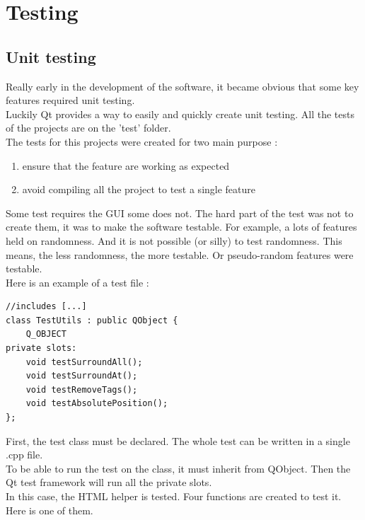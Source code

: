 \part{Testing}

\chapter{Unit testing}
Really early in the development of the software, it became obvious that some key features required unit testing.\\
Luckily Qt provides a way to easily and quickly create unit testing. All the tests of the projects are on the 'test' folder.\\
The tests for this projects were created for two main purpose :
\begin{enumerate}
	\item ensure that the feature are working as expected
	\item avoid compiling all the project to test a single feature
\end{enumerate}
Some test requires the GUI some does not. The hard part of the test was not to create them, it was to make the software testable. For example, a lots of features held on randomness. And it is not possible (or silly) to test randomness. This means, the less randomness, the more testable. Or pseudo-random features were testable.\\
Here is an example of a test file :

\begin{lstlisting}
//includes [...]
class TestUtils : public QObject {
    Q_OBJECT
private slots:
    void testSurroundAll();
    void testSurroundAt();
    void testRemoveTags();
    void testAbsolutePosition();
};
\end{lstlisting}
First, the test class must be declared. The whole test can be written in a single .cpp file.\\
To be able to run the test on the class, it must inherit from QObject. Then the Qt test framework will run all the
private slots.\\
In this case, the HTML helper is tested. Four functions are created to test it.\\
Here is one of them.

